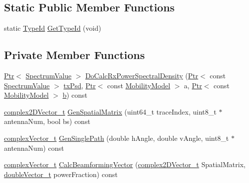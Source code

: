 \subsection*{Static Public Member Functions}
\begin{DoxyCompactItemize}
\item 
static \hyperlink{classns3_1_1TypeId}{Type\+Id} \hyperlink{classns3_1_1MmWaveChannelRaytracing_a5ce7a278e7d41a6ecd7dd9a2b5400f5b}{Get\+Type\+Id} (void)
\end{DoxyCompactItemize}
\subsection*{Private Member Functions}
\begin{DoxyCompactItemize}
\item 
\hyperlink{classns3_1_1Ptr}{Ptr}$<$ \hyperlink{classns3_1_1SpectrumValue}{Spectrum\+Value} $>$ \hyperlink{classns3_1_1MmWaveChannelRaytracing_acc7c4160f1e83ce989502aec3fda4814}{Do\+Calc\+Rx\+Power\+Spectral\+Density} (\hyperlink{classns3_1_1Ptr}{Ptr}$<$ const \hyperlink{classns3_1_1SpectrumValue}{Spectrum\+Value} $>$ \hyperlink{lte__link__budget__x2__handover__measures_8m_a684fe3101a5e48a5fcc57cab8dbcd1aa}{tx\+Psd}, \hyperlink{classns3_1_1Ptr}{Ptr}$<$ const \hyperlink{classns3_1_1MobilityModel}{Mobility\+Model} $>$ a, \hyperlink{classns3_1_1Ptr}{Ptr}$<$ const \hyperlink{classns3_1_1MobilityModel}{Mobility\+Model} $>$ \hyperlink{lte__pathloss_8m_a21ad0bd836b90d08f4cf640b4c298e7c}{b}) const 
\item 
\hyperlink{namespacens3_aa25e3feece2676fd7470d50d4ba3d1d1}{complex2\+D\+Vector\+\_\+t} \hyperlink{classns3_1_1MmWaveChannelRaytracing_a49dc87b1c7a9e87b2dfc0f64dbe3e543}{Gen\+Spatial\+Matrix} (uint64\+\_\+t trace\+Index, uint8\+\_\+t $\ast$antenna\+Num, bool bs) const 
\item 
\hyperlink{namespacens3_a6a7f75817ae50e6ac47414955b17d926}{complex\+Vector\+\_\+t} \hyperlink{classns3_1_1MmWaveChannelRaytracing_a8014182a34e2b345469219704ddf42fb}{Gen\+Single\+Path} (double h\+Angle, double v\+Angle, uint8\+\_\+t $\ast$antenna\+Num) const 
\item 
\hyperlink{namespacens3_a6a7f75817ae50e6ac47414955b17d926}{complex\+Vector\+\_\+t} \hyperlink{classns3_1_1MmWaveChannelRaytracing_a523c2da49105b8b3365e5a60e225b0ca}{Calc\+Beamforming\+Vector} (\hyperlink{namespacens3_aa25e3feece2676fd7470d50d4ba3d1d1}{complex2\+D\+Vector\+\_\+t} Spatial\+Matrix, \hyperlink{namespacens3_aa6f1edf6566ca6afec613bc6e40240ea}{double\+Vector\+\_\+t} power\+Fraction) const 

\end{DoxyCompactItemize}
